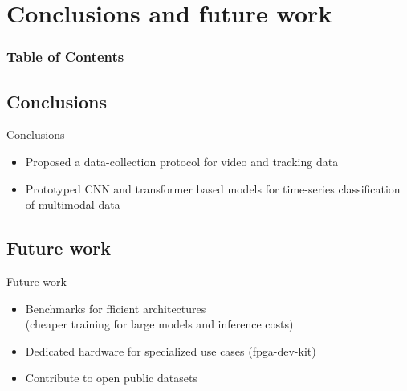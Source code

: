 
\section{Conclusions and future work}

\begin{frame}
  \frametitle{Table of Contents}
  \tableofcontents[currentsection]
\end{frame}

\subsection{Conclusions}
{
\begin{frame}{Conclusions}

\begin{itemize}
\item Proposed a data-collection protocol for video and tracking data
\item Prototyped CNN and transformer based models for time-series classification of multimodal data
\end{itemize}

\end{frame}
}


\subsection{Future work}
{
\begin{frame}{Future work}

\begin{itemize}
\item Benchmarks for fficient architectures \\ (cheaper training for large models and inference costs)
\item Dedicated hardware for specialized use cases (fpga-dev-kit)
\item Contribute to open public datasets
\end{itemize}

\end{frame}
}


